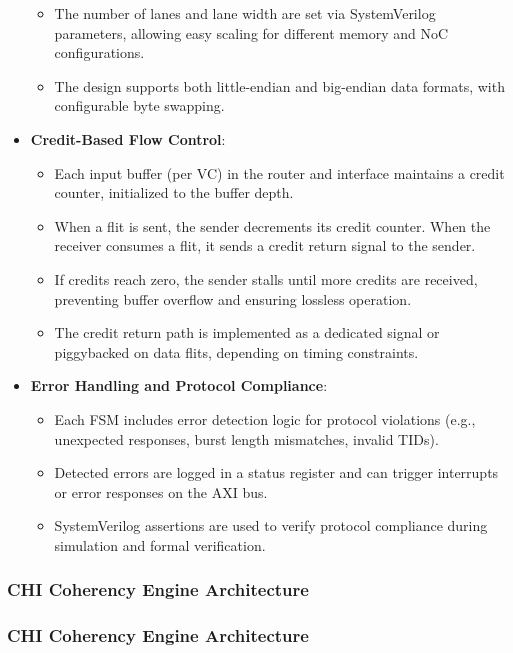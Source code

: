\documentclass[11pt,a4paper]{article}
\begin{document}
\begin{itemize}
\begin{itemize}
        \item The number of lanes and lane width are set via SystemVerilog parameters, allowing easy scaling for different memory and NoC configurations.
        \item The design supports both little-endian and big-endian data formats, with configurable byte swapping.
    \end{itemize}
    \item \textbf{Credit-Based Flow Control}:
    \begin{itemize}
        \item Each input buffer (per VC) in the router and interface maintains a credit counter, initialized to the buffer depth.
        \item When a flit is sent, the sender decrements its credit counter. When the receiver consumes a flit, it sends a credit return signal to the sender.
        \item If credits reach zero, the sender stalls until more credits are received, preventing buffer overflow and ensuring lossless operation.
        \item The credit return path is implemented as a dedicated signal or piggybacked on data flits, depending on timing constraints.
    \end{itemize}
    \item \textbf{Error Handling and Protocol Compliance}:
    \begin{itemize}
        \item Each FSM includes error detection logic for protocol violations (e.g., unexpected responses, burst length mismatches, invalid TIDs).
        \item Detected errors are logged in a status register and can trigger interrupts or error responses on the AXI bus.
        \item SystemVerilog assertions are used to verify protocol compliance during simulation and formal verification.
    \end{itemize}
\end{itemize}

\subsubsection{CHI Coherency Engine Architecture}

\subsubsection{CHI Coherency Engine Architecture}
\end{document}
